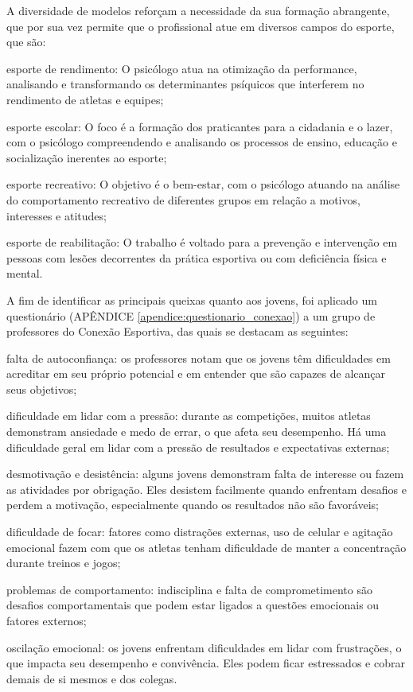 \begin{Desenvolvimento}
A diversidade de modelos reforçam a necessidade da sua formação abrangente, que por sua vez permite que o profissional atue em diversos campos do esporte, que são:
\begin{alinea}
  \item esporte de rendimento: O psicólogo atua na otimização da performance, analisando e transformando os determinantes psíquicos que interferem no rendimento de atletas e equipes;
  \item esporte escolar: O foco é a formação dos praticantes para a cidadania e o lazer, com o psicólogo compreendendo e analisando os processos de ensino, educação e socialização inerentes ao esporte;
  \item esporte recreativo: O objetivo é o bem-estar, com o psicólogo atuando na análise do comportamento recreativo de diferentes grupos em relação a motivos, interesses e atitudes;
  \item esporte de reabilitação: O trabalho é voltado para a prevenção e intervenção em pessoas com lesões decorrentes da prática esportiva ou com deficiência física e mental.
\end{alinea}

A fim de identificar as principais queixas quanto aos jovens, foi aplicado um questionário (APÊNDICE \ref{apendice:questionario_conexao}) a um grupo de professores do Conexão Esportiva, das quais se destacam as seguintes:
\begin{alinea}
  \item falta de autoconfiança: os professores notam que os jovens têm dificuldades em acreditar em seu próprio potencial e em entender que são capazes de alcançar seus objetivos;
  \item dificuldade em lidar com a pressão: durante as competições, muitos atletas demonstram ansiedade e medo de errar, o que afeta seu desempenho. Há uma dificuldade geral em lidar com a pressão de resultados e expectativas externas;
  \item desmotivação e desistência: alguns jovens demonstram falta de interesse ou fazem as atividades por obrigação. Eles desistem facilmente quando enfrentam desafios e perdem a motivação, especialmente quando os resultados não são favoráveis;
  \item dificuldade de focar: fatores como distrações externas, uso de celular e agitação emocional fazem com que os atletas tenham dificuldade de manter a concentração durante treinos e jogos;
  \item problemas de comportamento: indisciplina e falta de comprometimento são desafios comportamentais que podem estar ligados a questões emocionais ou fatores externos;
  \item oscilação emocional: os jovens enfrentam dificuldades em lidar com frustrações, o que impacta seu desempenho e convivência. Eles podem ficar estressados e cobrar demais de si mesmos e dos colegas.
\end{alinea}


\end{Desenvolvimento}
